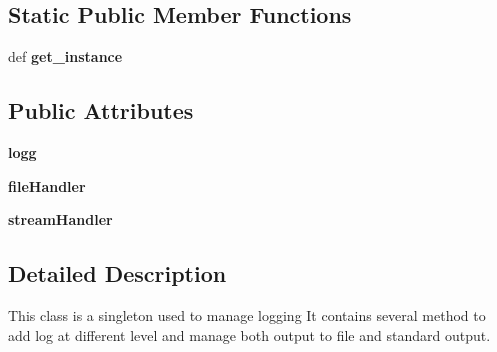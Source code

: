\subsection*{Static Public Member Functions}
\begin{DoxyCompactItemize}
\item 
\hypertarget{classsrc_1_1core_1_1util_1_1log_1_1Logger_1_1Logger_ada4abcd33038a24673dab983551410e9}{def {\bfseries get\-\_\-instance}}\label{classsrc_1_1core_1_1util_1_1log_1_1Logger_1_1Logger_ada4abcd33038a24673dab983551410e9}

\end{DoxyCompactItemize}
\subsection*{Public Attributes}
\begin{DoxyCompactItemize}
\item 
\hypertarget{classsrc_1_1core_1_1util_1_1log_1_1Logger_1_1Logger_a9d9e84ff94372c1e5df22ad924cd7538}{{\bfseries logg}}\label{classsrc_1_1core_1_1util_1_1log_1_1Logger_1_1Logger_a9d9e84ff94372c1e5df22ad924cd7538}

\item 
\hypertarget{classsrc_1_1core_1_1util_1_1log_1_1Logger_1_1Logger_a7df0c0e686b7013df71564196209b627}{{\bfseries file\-Handler}}\label{classsrc_1_1core_1_1util_1_1log_1_1Logger_1_1Logger_a7df0c0e686b7013df71564196209b627}

\item 
\hypertarget{classsrc_1_1core_1_1util_1_1log_1_1Logger_1_1Logger_a0ca2b895b72e12f474f13e36fe774a85}{{\bfseries stream\-Handler}}\label{classsrc_1_1core_1_1util_1_1log_1_1Logger_1_1Logger_a0ca2b895b72e12f474f13e36fe774a85}

\end{DoxyCompactItemize}


\subsection{Detailed Description}
This class is a singleton used to manage logging It contains several method to add log at different level and manage both output to file and standard output. 

